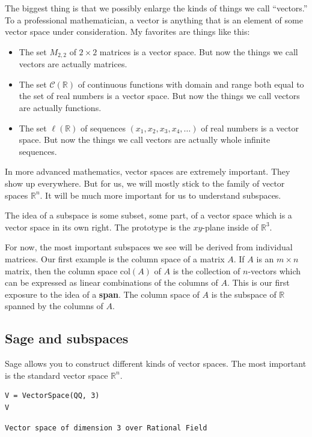 \documentclass[10pt,]{book}
\newcommand{\terminology}[1]{\textbf{#1}}
\theoremstyle{plain}
\numberwithin{equation}{section}
\begin{document}
      The biggest thing is that we possibly enlarge the kinds of things we
      call ``vectors.'' To a professional mathematician, a vector is
      anything that is an element of some vector space under consideration.
      My favorites are things like this:
\begin{itemize}
\item{}
        The set \(M_{2,2}\) of \(2\times 2\) matrices is a vector space.
        But now the things we call vectors are actually matrices.
      \item{}
        The set \(\mathcal{C}(\mathbb{R})\) of continuous functions with
        domain and range both equal to the set of real numbers is a vector
        space. But now the things we call vectors are actually functions.
      \item{}
        The set \(\ell(\mathbb{R})\) of sequences
        \((x_1, x_2, x_3, x_4, \ldots)\) of real numbers is a vector space.
        But now the things we call vectors are actually whole infinite sequences.
      \end{itemize}
\par

      In more advanced mathematics, vector spaces are extremely important. They
      show up everywhere. But for us, we will mostly stick to the family of vector
      spaces \(\mathbb{R}^n\). It will be much more important for us to understand
      subspaces.
\par

      The idea of a subspace is some subset, some part, of a vector space which
      is a vector space in its own right. The prototype is the \(xy\)-plane
      inside of \(\mathbb{R}^3\).
\par

      For now, the most important subspaces we see will be derived from
      individual matrices. Our first example is the column space of a matrix
      \(A\). If \(A\) is an \(m\times n\) matrix, then the column
      space \(\mathrm{col}(A)\) of \(A\) is the collection of
      \(n\)-vectors which can be expressed as linear combinations of the
      columns of \(A\). This is our first exposure to the idea of a
      \terminology{span}. The column space of \(A\) is the subspace of
      \(\mathbb{R}\) spanned by the columns of \(A\).
\typeout{************************************************}
\typeout{************************************************}
\subsection[Sage and subspaces]{Sage and subspaces}\label{subsection-61}
Sage allows you to construct different kinds of vector spaces. The most
      important is the standard vector space \(\mathbb{R}^n\).
\begin{lstlisting}[style=sageinput]
V = VectorSpace(QQ, 3)
V
\end{lstlisting}
\begin{lstlisting}[style=sageoutput]
Vector space of dimension 3 over Rational Field
\end{lstlisting}
\par
\end{document}
